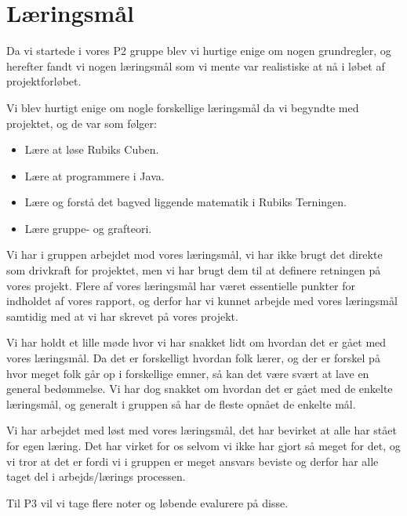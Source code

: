 \section{L\ae{}ringsm\aa{}l}
Da vi startede i vores P2 gruppe blev vi hurtige enige om nogen grundregler, og herefter fandt vi nogen l\ae{}ringsm\aa{}l som vi mente var realistiske at n\aa{} i l\o{}bet af projektforl\o{}bet.

Vi blev hurtigt enige om nogle forskellige l\ae{}ringsm\aa{}l da vi begyndte med projektet, og de var som f\o{}lger:

\begin{itemize}
\item L\ae{}re at l\o{}se Rubiks Cuben.
\item L\ae{}re at programmere i Java.
\item L\ae{}re  og forst\aa{} det bagved liggende matematik i Rubiks Terningen. 
\item L\ae{}re gruppe- og grafteori.
\end{itemize}

Vi har i gruppen arbejdet mod vores l\ae{}ringsm\aa{}l, vi har ikke brugt det direkte som drivkraft for projektet, men vi har brugt dem til at definere retningen p\aa{} vores projekt.
Flere af vores l\ae{}ringsm\aa{}l har v\ae{}ret essentielle punkter for indholdet af vores rapport, og derfor har vi kunnet arbejde med vores l\ae{}ringsm\aa{}l samtidig med at vi har skrevet p\aa{} vores projekt.

Vi har holdt et lille m\o{}de hvor vi har snakket lidt om hvordan det er g\aa{}et med vores l\ae{}ringsm\aa{}l. Da det er forskelligt hvordan folk l\ae{}rer, og der er forskel p\aa{} hvor meget folk g\aa{}r op i forskellige emner, s\aa{} kan det v\ae{}re sv\ae{}rt at lave en general bed\o{}mmelse. Vi har dog snakket om hvordan det er g\aa{}et med de enkelte l\ae{}ringsm\aa{}l, og generalt i gruppen s\aa{} har de fleste opn\aa{}et de enkelte m\aa{}l.

Vi har arbejdet med l\o{}st med vores l\ae{}ringsm\aa{}l, det har bevirket at alle har st\aa{}et for egen l\ae{}ring. Det har virket for os selvom vi ikke har gjort s\aa{} meget for det, og vi tror at det er fordi vi i gruppen er meget ansvars beviste og derfor har alle taget del i arbejds/l\ae{}rings processen.

Til P3 vil vi tage flere noter og l\o{}bende evalurere p\aa{} disse.

